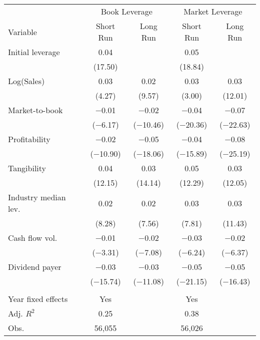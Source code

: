 \begin{tabular}{l*{4}{c}}
\toprule
 & \multicolumn{2}{c}{Book Leverage} & \multicolumn{2}{c}{Market Leverage} \\ \cmidrule(lr){2-3} \cmidrule(lr){4-5}
Variable & Short Run & Long Run & Short Run & Long Run \\ \midrule
Initial leverage&        0.04&            &        0.05&            \\
            &     (17.50)&            &     (18.84)&            \\
\addlinespace
Log(Sales)  &        0.03&        0.02&        0.03&        0.03\\
            &      (4.27)&      (9.57)&      (3.00)&     (12.01)\\
\addlinespace
Market-to-book&     $-$0.01&     $-$0.02&     $-$0.04&     $-$0.07\\
            &   ($-$6.17)&  ($-$10.46)&  ($-$20.36)&  ($-$22.63)\\
\addlinespace
Profitability&     $-$0.02&     $-$0.05&     $-$0.04&     $-$0.08\\
            &  ($-$10.90)&  ($-$18.06)&  ($-$15.89)&  ($-$25.19)\\
\addlinespace
Tangibility &        0.04&        0.03&        0.05&        0.03\\
            &     (12.15)&     (14.14)&     (12.29)&     (12.05)\\
\addlinespace
Industry median lev.&        0.02&        0.02&        0.03&        0.03\\
            &      (8.28)&      (7.56)&      (7.81)&     (11.43)\\
\addlinespace
Cash flow vol.&     $-$0.01&     $-$0.02&     $-$0.03&     $-$0.02\\
            &   ($-$3.31)&   ($-$7.08)&   ($-$6.24)&   ($-$6.37)\\
\addlinespace
Dividend payer&     $-$0.03&     $-$0.03&     $-$0.05&     $-$0.05\\
            &  ($-$15.74)&  ($-$11.08)&  ($-$21.15)&  ($-$16.43)\\
\\
Year fixed effects&         Yes&            &         Yes&            \\
Adj. $ R^2$ &        0.25&            &        0.38&            \\
Obs.        &      56,055&            &      56,026&            \\
\bottomrule
\end{tabular}
